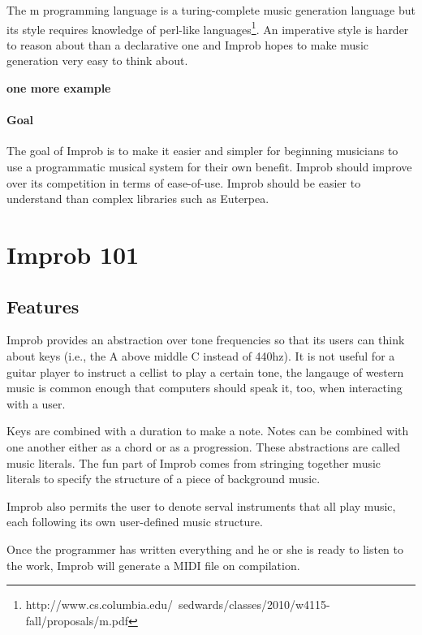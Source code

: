 \documentclass{sigplanconf-pldi15}
\begin{document}
The m programming language is a turing-complete music generation language but its style requires knowledge of perl-like languages\footnote{http://www.cs.columbia.edu/~sedwards/classes/2010/w4115-fall/proposals/m.pdf}. An imperative style is harder to reason about than a declarative one and Improb hopes to make music generation very easy to think about.

\textbf{one more example}

\paragraph{Goal}
The goal of Improb is to make it easier and simpler for beginning musicians to use a programmatic musical system for their own benefit. Improb should improve over its competition in terms of ease-of-use. Improb should be easier to understand than complex libraries such as Euterpea.

\section{Improb 101}
\subsection{Features}
Improb provides an abstraction over tone frequencies so that its users can think about keys (i.e., the A above middle C instead of 440hz). It is not useful for a guitar player to instruct a cellist to play a certain tone, the langauge of western music is common enough that computers should speak it, too, when interacting with a user.

Keys are combined with a duration to make a note. Notes can be combined with one another either as a chord or as a progression. These abstractions are called music literals. The fun part of Improb comes from stringing together music literals to specify the structure of a piece of background music.

Improb also permits the user to denote serval instruments that all play music, each following its own user-defined music structure.

Once the programmer has written everything and he or she is ready to listen to the work, Improb will generate a MIDI file on compilation.
\end{document}
